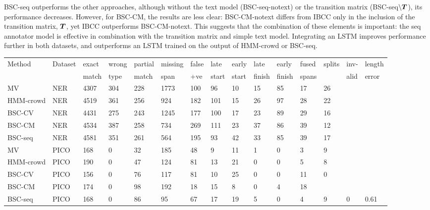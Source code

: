 BSC-seq outperforms the other approaches, although 
without the text model (BSC-seq-notext) or the transition matrix (BSC-seq$\backslash\boldsymbol T$),
its performance decreases.
However, for BSC-CM, the results are less clear: BSC-CM-notext differs from IBCC only in the 
inclusion of the transition matrix, $\boldsymbol T$, yet IBCC outperforms BSC-CM-notext.
This suggests that the combination of these elements is important: the seq annotator model is effective 
in combination with the transition matrix and simple text model.
Integrating an LSTM improves performance further in both datasets, and outperforms an LSTM trained on the output of HMM-crowd or BSC-seq.

\begin{table}[h]
\small
\centering
\setlength{\tabcolsep}{4pt}
\begin{tabular}{l l l l l l l l l l l l l l l }
\toprule
Method & Dataset & exact & wrong & partial  & missing  & false & late & early & late & early & fused & splits & inv- &  length \\ 
 & & match & type & match & span & +ve & start & start & finish & finish & spans &  & alid & error \\
\midrule
MV & NER & 4307 & 304 & 228 & 1773 & 100 & 96 & 10 & 15 & 85 & 17 & 26 \\
HMM-crowd & NER & 4519 & 361 & 256 & 924 & 182 & 101 & 15 & 26 & 97 & 28 & 22 \\
BSC-CV & NER & 4431 & 275 & 243 & 1245 & 177 & 100 & 17 & 23 & 89 & 29 & 16 \\
BSC-CM & NER & 4534 & 387 & 258 & 734 & 269 & 111 & 23 & 37 & 86 & 39 & 12 \\
BSC-seq & NER & 4581 & 351 & 261 & 564 & 195 & 93 & 42 & 33 & 85 & 39 & 17 
\\
\midrule 
MV & PICO  & 168 & 0 & 32 & 185 & 48 & 9 & 11 & 1 & 0 & 3 & 9 \\
HMM-crowd& PICO & 190 & 0 & 47 & 124 & 81 & 13 & 21 & 0 & 0 & 5 & 8 \\
BSC-CV     & PICO & 156 & 0 & 76 & 117 & 81 & 10 & 25 & 0 & 0 & 11 & 0 \\
BSC-CM     & PICO & 174 & 0 & 98 & 192 & 18 & 15 & 8  & 0 & 4 & 18 \\
BSC-seq    & PICO & 168 & 0 & 86 & 95 & 67 & 17 & 19 & 5 & 0 & 4 & 9 & 0 & 0.61 \\

\end{tabular}
\end{table}
